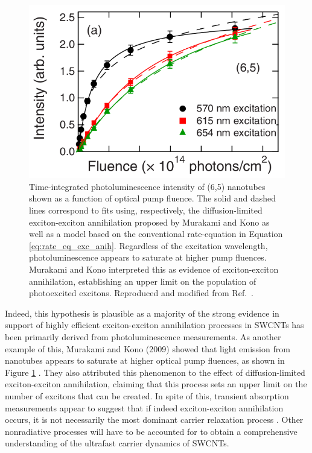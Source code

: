 \begin{figure}[ht]
	\centering
	\includegraphics[scale=1.7]{images/chapter_prior_works/murakami_pl_saturation}
	\caption{Time-integrated photoluminescence intensity of (6,5) nanotubes shown as a function of optical pump fluence. The solid and dashed lines correspond to fits using, respectively, the diffusion-limited exciton-exciton annihilation proposed by Murakami and Kono as well as a model based on the conventional rate-equation in Equation \eqref{eq:rate_eq_exc_anih}. Regardless of the excitation wavelength, photoluminescence appears to saturate at higher pump fluences. Murakami and Kono interpreted this as evidence of exciton-exciton annihilation, establishing an upper limit on the population of photoexcited excitons. Reproduced and modified from Ref.\  \cite{murakami2009existence}. }
	\label{fig:pl_saturation_murakami}
\end{figure}

 Indeed, this hypothesis is plausible as a majority of the strong evidence in support of highly efficient exciton-exciton annihilation processes in SWCNTs has been primarily derived from photoluminescence measurements. As another example of this, Murakami and Kono (2009) showed that light emission from nanotubes appears to saturate at higher optical pump fluences, as shown in Figure \ref{fig:pl_saturation_murakami} \cite{murakami2009existence}. They also attributed this phenomenon to the effect of diffusion-limited exciton-exciton annihilation, claiming that this process sets an upper limit on the number of excitons that can be created. In spite of this, transient absorption measurements appear to suggest that if indeed exciton-exciton annihilation occurs, it is not necessarily the most dominant carrier relaxation process \cite{ostojic2004interband, manzoni2005intersubband, luer2009size}. Other nonradiative processes will have to be accounted for to obtain a comprehensive understanding of the ultrafast carrier dynamics of SWCNTs.

